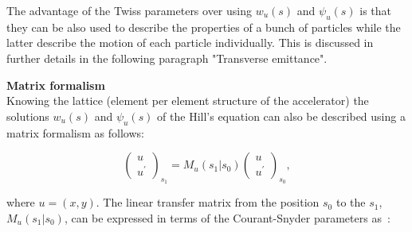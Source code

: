 
The advantage of the Twiss parameters over using $w_u(s)$ and $\psi_u(s)$ is that they can be also used to describe the properties of a bunch of particles while the latter describe the motion of each particle individually. This is discussed in further details in the following paragraph "Transverse emittance". %


\textbf{Matrix formalism}\\
Knowing the lattice (element per element structure of the accelerator) the solutions $w_u(s)$ and $\psi_u(s)$ of the Hill's equation can also be described using a matrix formalism as follows:

\begin{equation}\label{eq:matrix_formalism_intro}
   \begin{pmatrix}
    u\\ 
    u^\prime
    \end{pmatrix}_{s_1} = M_u (s_1 |  s_0) \begin{pmatrix}
    u\\ 
    u^\prime
    \end{pmatrix}_{s_0},
\end{equation}

where $u=(x,y)$. The linear transfer matrix from the position $s_0$ to the $s_1$, $M_u (s_1 | s_0)$, can be expressed in terms of the Courant-Snyder parameters as~\cite{Lee:1425444}: %

